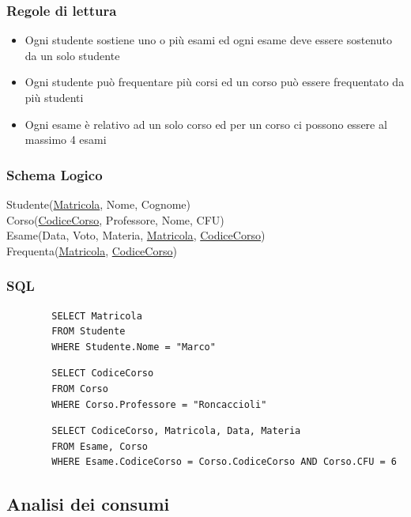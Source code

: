 \documentclass{article}
\begin{document}
	\subsubsection{Regole di lettura}
	\begin{itemize}
		\item Ogni studente sostiene uno o più esami ed ogni esame deve essere sostenuto da un solo studente
		\item Ogni studente può frequentare più corsi ed un corso può essere frequentato da più studenti
		\item Ogni esame è relativo ad un solo corso ed per un corso ci possono essere al massimo 4 esami
	\end{itemize}
	\subsubsection{Schema Logico}
	Studente(\underline{Matricola}, Nome, Cognome)\\
	Corso(\underline{CodiceCorso}, Professore, Nome, CFU)\\
	Esame(Data, Voto, Materia, \underline{Matricola}, \underline{CodiceCorso})\\
	Frequenta(\underline{Matricola}, \underline{CodiceCorso})
	\subsubsection{SQL}
	\begin{verbatim}
		SELECT Matricola
		FROM Studente
		WHERE Studente.Nome = "Marco"
	\end{verbatim}
	\begin{verbatim}
		SELECT CodiceCorso
		FROM Corso
		WHERE Corso.Professore = "Roncaccioli"
	\end{verbatim}
	\begin{verbatim}
		SELECT CodiceCorso, Matricola, Data, Materia
		FROM Esame, Corso
		WHERE Esame.CodiceCorso = Corso.CodiceCorso AND Corso.CFU = 6
	\end{verbatim}

	\pagebreak
	
	\subsection{Analisi dei consumi}
\end{document}
